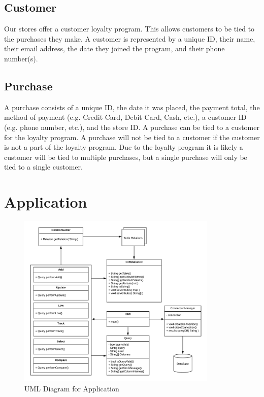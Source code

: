\documentclass{article}
\begin{document}
		\subsection{Customer}
			Our stores offer a customer loyalty program. This allows customers to be
			tied to the purchases they make. A customer is represented by a unique ID,
			their name, their email address, the date they joined the program, and
			their phone number(s).

		\subsection{Purchase}
			A purchase consists of a unique ID, the date it was placed, the payment
			total, the method of payment (e.g. Credit Card, Debit Card, Cash, etc.), a
			customer ID (e.g. phone number, etc.), and the store ID. A purchase can
			be tied to a customer for the loyalty program. A purchase will not be
			tied to a customer if the customer is not a part of the loyalty program.
			Due to the loyalty program it is likely a customer will be tied to
			multiple purchases, but a single purchase will only be tied to a
			single customer.
			
	\section{Application}
    \begin{figure}[H]
      \centering
      \includegraphics[width=0.85\textwidth]{uml_diagram}
      \caption{UML Diagram for Application}
      \label{fig:uml}
    \end{figure}
	
\end{document}
